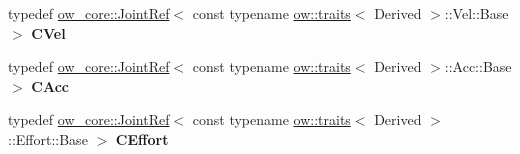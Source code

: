 \begin{DoxyCompactItemize}
\item 
typedef \hyperlink{classow__core_1_1JointRef}{ow\+\_\+core\+::\+Joint\+Ref}$<$ const typename \hyperlink{structow_1_1traits}{ow\+::traits}$<$ Derived $>$\+::Vel\+::\+Base $>$ {\bfseries C\+Vel}\hypertarget{classow__core_1_1JointStateRef_a73d993efb4968705602dea064dffffa5}{}\label{classow__core_1_1JointStateRef_a73d993efb4968705602dea064dffffa5}

\item 
typedef \hyperlink{classow__core_1_1JointRef}{ow\+\_\+core\+::\+Joint\+Ref}$<$ const typename \hyperlink{structow_1_1traits}{ow\+::traits}$<$ Derived $>$\+::Acc\+::\+Base $>$ {\bfseries C\+Acc}\hypertarget{classow__core_1_1JointStateRef_a782a6fc877cb5cc9e85545fd80f56f45}{}\label{classow__core_1_1JointStateRef_a782a6fc877cb5cc9e85545fd80f56f45}

\item 
typedef \hyperlink{classow__core_1_1JointRef}{ow\+\_\+core\+::\+Joint\+Ref}$<$ const typename \hyperlink{structow_1_1traits}{ow\+::traits}$<$ Derived $>$\+::Effort\+::\+Base $>$ {\bfseries C\+Effort}\hypertarget{classow__core_1_1JointStateRef_a6cdb029546a50ed423b8a2799212b7b2}{}\label{classow__core_1_1JointStateRef_a6cdb029546a50ed423b8a2799212b7b2}

\end{DoxyCompactItemize}

